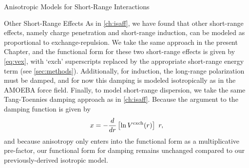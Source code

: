\begin{subsection}{Anisotropic Models for Short-Range Interactions}
\begin{subsubsection}{Other Short-Range Effects}
As in \cref{ch:isaff},\cite{VanVleet2016} we have found that other short-range effects, namely charge
penetration and short-range induction, can be modeled as proportional to
exchange-repulsion. We take the same approach in the present Chapter, and
the functional form for these two short-range effects is given by
\cref{eq:vex}, with `exch' superscripts replaced by the appropriate short-range
energy term (see \cref{sec:methods}).
Additionally, for induction, the long-range polarization must be damped, and
for now this damping is modeled isotropically
as in the AMOEBA force field.\cite{Shi2013} 
%
Finally, to model short-range dispersion, we
take the same Tang-Toennies\cite{Tang1984,Tang1992} damping approach as in
\cref{ch:isaff}.\cite{VanVleet2016} Because the argument to the damping function is given by 
\[
x = -\frac{d}{dr}\left[\ln V^{\text{exch}}(r)\right] \ r,
\]
and because anisotropy only enters into the functional form as a
multiplicative pre-factor, our functional form for damping remains unchanged
compared to our previously-derived isotropic model.\cite{VanVleet2016}

\end{subsubsection}
\end{subsection}

